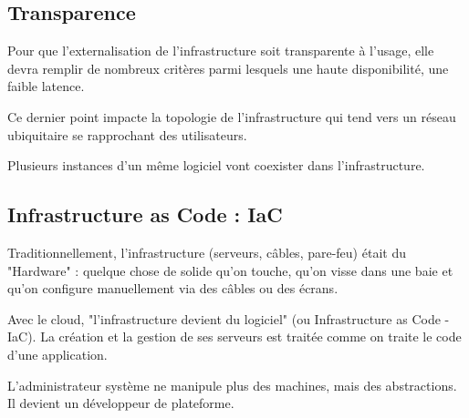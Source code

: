 \documentclass{report} %
\begin{document}
\subsection{Transparence}
Pour que l'externalisation de l'infrastructure soit transparente à l'usage, elle
devra remplir de nombreux critères parmi lesquels une haute
disponibilité, une faible latence.

Ce dernier point impacte la topologie de l'infrastructure qui tend
vers un réseau ubiquitaire se rapprochant des utilisateurs.

Plusieurs instances d'un même logiciel vont coexister dans l'infrastructure.


\subsection{Infrastructure as Code : IaC}

Traditionnellement, l'infrastructure (serveurs, câbles, pare-feu)
était du "Hardware" : quelque chose de solide qu'on touche, qu'on
visse dans une baie et qu'on configure manuellement via des câbles ou
des écrans.

Avec le cloud, "l'infrastructure devient du logiciel" (ou
Infrastructure as Code - IaC). La création et la gestion de ses
serveurs est traitée comme on traite le code d'une application.

L'administrateur système ne manipule plus des machines, mais des
abstractions. Il devient un développeur de plateforme.
\end{document}
